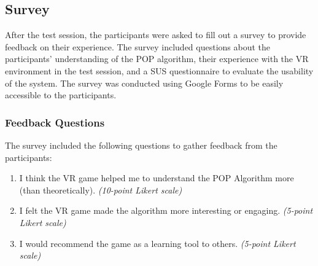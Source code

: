 \subsection{Survey} \label{sec:survey}
After the test session, the participants were asked to fill out a survey to provide feedback on their experience. The survey included questions about the participants' understanding of the \ac{POP} algorithm, their experience with the \ac{VR} environment in the test session, and a \ac{SUS} questionnaire to evaluate the usability of the system. The survey was conducted using Google Forms to be easily accessible to the participants.

\subsubsection{Feedback Questions} \label{sec:feedback_questions}
The survey included the following questions to gather feedback from the participants:
\begin{enumerate}
    \item I think the VR game helped me to understand the POP Algorithm more (than theoretically). \textit{(10-point Likert scale)}
    \item I felt the VR game made the algorithm more interesting or engaging. \textit{(5-point Likert scale)}
    \item I would recommend the game as a learning tool to others. \textit{(5-point Likert scale)}
\end{enumerate}


